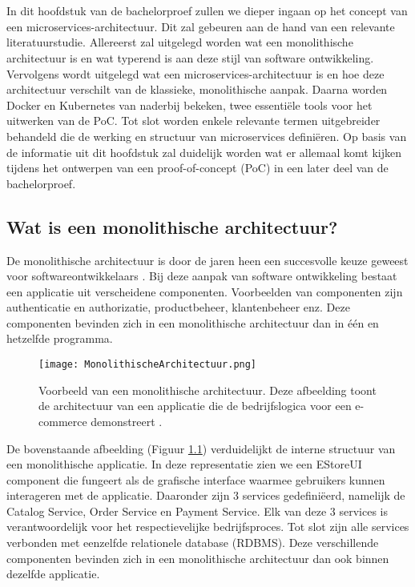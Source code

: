 \chapter{}%
\label{ch:stand-van-zaken}

In dit hoofdstuk van de bachelorproef zullen we dieper ingaan op het concept van een microservices-architectuur. Dit zal gebeuren aan de hand van een relevante literatuurstudie. Allereerst zal uitgelegd worden wat een monolithische architectuur is en wat typerend is aan deze stijl van software ontwikkeling. Vervolgens wordt uitgelegd wat een microservices-architectuur is en hoe deze architectuur verschilt van de klassieke, monolithische aanpak. Daarna worden Docker en Kubernetes van naderbij bekeken, twee essentiële tools voor het uitwerken van de PoC. Tot slot worden enkele relevante termen uitgebreider behandeld die de werking en structuur van microservices definiëren. Op basis van de informatie uit dit hoofdstuk zal duidelijk worden wat er allemaal komt kijken tijdens het ontwerpen van een proof-of-concept (PoC) in een later deel van de bachelorproef.

\section{Wat is een monolithische architectuur?}

De monolithische architectuur is door de jaren heen een succesvolle keuze geweest voor softwareontwikkelaars \autocite{Gos2020}. Bij deze aanpak van software ontwikkeling bestaat een applicatie uit verscheidene componenten. Voorbeelden van componenten zijn authenticatie en authorizatie, productbeheer, klantenbeheer enz. Deze componenten bevinden zich in een monolithische architectuur dan in één en hetzelfde programma.

\begin{figure}[H]
  \centering
  \texttt{[image: MonolithischeArchitectuur.png]}
  \caption[Voorstelling van een monolitische architectuur]{\label{fig:monolithische architectuur}Voorbeeld van een monolithische architectuur. Deze afbeelding toont de architectuur van een applicatie die de bedrijfslogica voor een e-commerce demonstreert \autocite{Gos2020}.}
\end{figure}

De bovenstaande afbeelding (Figuur \ref{fig:monolithische architectuur}) verduidelijkt de interne structuur van een monolithische applicatie. In deze representatie zien we een EStoreUI component die fungeert als de grafische interface waarmee gebruikers kunnen interageren met de applicatie. Daaronder zijn 3 services gedefiniëerd, namelijk de Catalog Service, Order Service en Payment Service. Elk van deze 3 services is verantwoordelijk voor het respectievelijke bedrijfsproces. Tot slot zijn alle services verbonden met eenzelfde relationele database (RDBMS). Deze verschillende componenten bevinden zich in een monolithische architectuur dan ook binnen dezelfde applicatie.\newline

